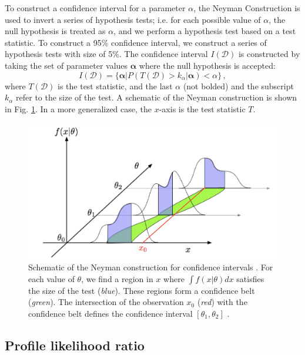 To construct a confidence interval for a parameter $\alpha$, the Neyman Construction is used to invert a series of hypothesis tests; i.e. for each possible value of $\alpha$, the null hypothesis is treated as $\alpha$, and we perform a hypothesis test based on a test statistic. To construct a 95\% confidence interval, we construct a series of hypothesis tests with size of 5\%. The confidence interval $I(\mathcal{D})$ is constructed by taking the set of parameter values $\boldsymbol{\alpha}$ where the null hypothesis is accepted:
\begin{equation}
    I(\mathcal{D}) = \{ \boldsymbol{\alpha} | P(T(\mathcal{D}) > k_\alpha | \boldsymbol{\alpha}) < \alpha \} \, ,
\end{equation} 
where $T(\mathcal{D})$ is the test statistic, and the last $\alpha$ (not bolded) and the subscript $k_\alpha$ refer to the size of the test. A schematic of the Neyman construction is shown in Fig. \ref{fig:neyman-construction}. In a more generalized case, the $x$-axis is the test statistic $T$.

\begin{figure}[ht]
    \centering  
    \includegraphics[width=12cm]{figures/ch-9-event-categorization-and-signal-extraction/schematic_neyman_construction.png}
    \caption[Schematic of the Neyman construction for confidence intervals.]{Schematic of the Neyman construction for confidence intervals \cite{2011-Statistics-Cranmer}. For each value of $\theta$, we find a region in $x$ where $\int f(x|\theta) dx$ satisfies the size of the test (\textit{blue}). These regions form a confidence belt (\textit{green}). The intersection of the observation $x_0$ (\textit{red}) with the confidence belt defines the confidence interval $[\theta_1, \theta_2]$ \cite{2011-Statistics-Cranmer}.} 
    \label{fig:neyman-construction}
\end{figure}

\subsection{Profile likelihood ratio}

